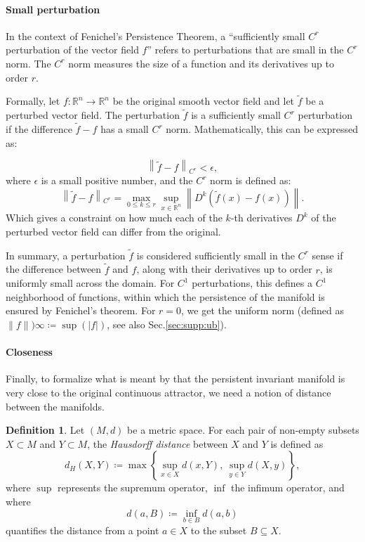 \documentclass{article} %
\newcounter{ct}
\theoremstyle{definition}
\newtheorem{definition}{Definition}
\theoremstyle{remark}
\begin{document}
\paragraph{Small perturbation}
In the context of Fenichel's Persistence Theorem, a ``sufficiently small \( C^{r} \) perturbation of the vector field \( f \)'' refers to perturbations that are small in the \( C^{r} \) norm. The \( C^{r} \) norm measures the size of a function and its derivatives up to order \( r \).

Formally, let \( f: \mathbb{R}^{n} \rightarrow \mathbb{R}^{n} \) be the original smooth vector field and let \( \tilde{f} \) be a perturbed vector field. The perturbation \( \tilde{f} \) is a sufficiently small \( C^{r} \) perturbation if the difference \( \tilde{f} - f \) has a small \( C^{r} \) norm. Mathematically, this can be expressed as:

\[ \left\| \tilde{f} - f \right\|_{C^{r}} < \epsilon, \]
where \( \epsilon \) is a small positive number, and the \( C^{r} \) norm is defined as:
\[ \left\| \tilde{f} - f \right\|_{C^{r}} = \max_{0 \leq k \leq r} \sup_{x \in \mathbb{R}^{n}} \left\| D^{k} (\tilde{f}(x) - f(x)) \right\|. \]
Which gives a constraint on how much each of the \(k\)-th derivatives \( D^{k} \) of the perturbed vector field can differ from the original.

In summary, a perturbation \( \tilde{f} \) is considered sufficiently small in the \( C^{r} \) sense if the difference between \( \tilde{f} \) and \( f \), along with their derivatives up to order \( r \), is uniformly small across the domain.
For \(C^{1}\) perturbations, this defines a \(C^{1}\)  neighborhood of functions, within which the persistence of the manifold is ensured by Fenichel's theorem.
For $r=0$, we get the uniform norm (defined as \(\|f\|)\infty\coloneqq \sup(|f|)\), see also Sec.\ref{sec:supp:ub}).


\paragraph{Closeness}
Finally, to formalize what is meant by that the persistent invariant manifold is very close to the original continuous attractor, we need a notion of distance between the manifolds.
\begin{definition}
Let \((M, d)\) be a metric space. For each pair of non-empty subsets \(X \subset M\) and \(Y \subset M\), the \emph{Hausdorff distance} between \(X\) and \(Y\) is defined as
\[
d_{H}(X, Y) \coloneqq \max \left\{ \sup_{x \in X} d(x, Y), \ \sup_{y \in Y} d(X, y) \right\},
\]
where \(\sup\) represents the supremum operator, \(\inf\) the infimum operator, and where
\[
d(a, B) \coloneqq \inf_{b \in B} d(a, b)
\]
quantifies the distance from a point \(a \in X\) to the subset \(B \subseteq X\).
\end{definition}
\end{document}
